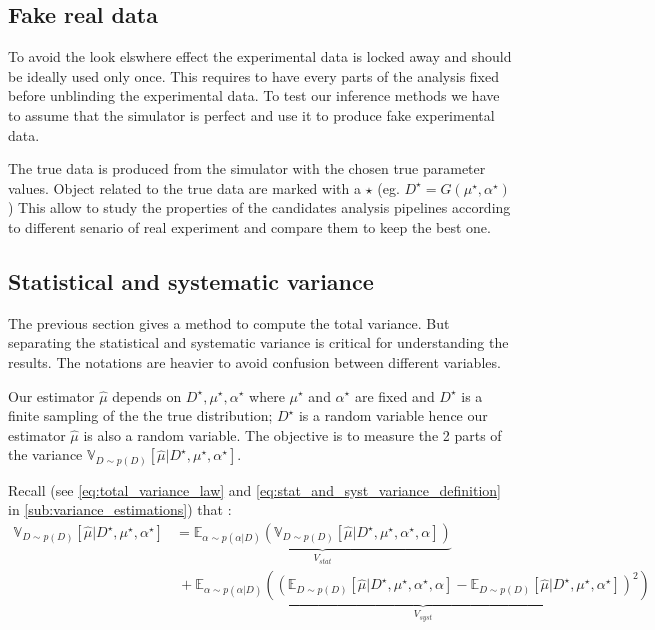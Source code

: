 \subsection{Fake real data} %
\label{sub:fake_real_data}


To avoid the look elswhere effect the experimental data is locked away and should be ideally used only once.
This requires to have every parts of the analysis fixed before unblinding the experimental data.
To test our inference methods we have to assume that the simulator is perfect and use it to produce fake experimental data.

The true data is produced from the simulator with the chosen true parameter values.
Object related to the true data are marked with a $\star$ (eg. $D^\star = G(\mu^\star, \alpha^\star) $ )
This allow to study the properties of the candidates analysis pipelines according to different senario of real experiment and compare them to keep the best one.










\subsection{Statistical and systematic variance} %
\label{sub:statistical_and_systematic_variance}


The previous section gives a method to compute the total variance.
But separating the statistical and systematic variance is critical for understanding the results.
The notations are heavier to avoid confusion between different variables.

Our estimator $\hat \mu$ depends on $D^\star, \mu^\star, \alpha^\star$ where $\mu^\star$ and $\alpha^\star$ are fixed and $D^\star$ is a finite sampling of the the true distribution;
$D^\star$ is a random variable hence our estimator $\hat \mu$ is also a random variable.
The objective is to measure the 2 parts of the variance $\mathbb{V}_{D\sim p(D)}[\hat \mu | D^\star, \mu^\star, \alpha^\star]$.

Recall (see \autoref{eq:total_variance_law} and \autoref{eq:stat_and_syst_variance_definition} in \autoref{sub:variance_estimations}) that :
\begin{align}
\mathbb{V}_{D\sim p(D)}[\hat \mu | D^\star, \mu^\star, \alpha^\star] 
 & = \underbrace{\mathbb{E}_{\alpha \sim p(\alpha|D)} \left (\mathbb{V}_{D\sim p(D)}[\hat \mu | D^\star, \mu^\star, \alpha^\star, \alpha] \right )}_{V_{stat}} \\
 & ~ + \underbrace{\mathbb{E}_{\alpha \sim p(\alpha|D)} \left ( (\mathbb{E}_{D\sim p(D)} [\hat \mu | D^\star, \mu^\star, \alpha^\star, \alpha]  - \mathbb{E}_{D\sim p(D)}[\hat \mu | D^\star, \mu^\star, \alpha^\star])^2\right )}_{V_{syst}}
\end{align}

